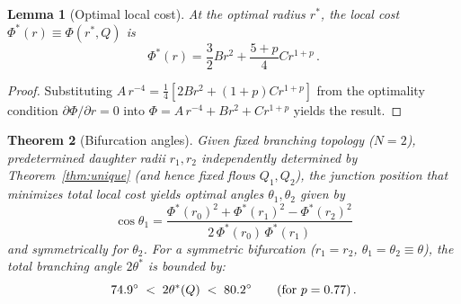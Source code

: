 \documentclass[11pt,a4paper]{article}
\newtheorem{theorem}{Theorem}
\newtheorem{lemma}[theorem]{Lemma}
\theoremstyle{remark}
\begin{document}
\begin{lemma}[Optimal local cost]
\label{lem:cost_opt}
At the optimal radius $r^*$, the local cost $\Phi^*(r) \equiv \Phi(r^*, Q)$ is
\begin{equation}
  \Phi^*(r) = \frac{3}{2}B r^2 + \frac{5+p}{4}C r^{1+p}\,.
  \label{eq:phi_star}
\end{equation}
\end{lemma}
\begin{proof}
Substituting $A\, r^{-4} = \frac{1}{4}[2B r^2 + (1+p)C r^{1+p}]$ from the
optimality condition $\partial\Phi/\partial r = 0$ into $\Phi = A\,r^{-4} + B
r^2 + C r^{1+p}$ yields the result.
\end{proof}

\begin{theorem}[Bifurcation angles]
\label{thm:angles}
Given fixed branching topology ($N=2$), predetermined daughter radii $r_1, r_2$
independently determined by Theorem~\ref{thm:unique} (and hence fixed flows
$Q_1, Q_2$), the junction position that minimizes total local cost yields
optimal angles $\theta_1, \theta_2$ given by
\begin{equation}
  \cos\theta_1 = \frac{\Phi^*(r_0)^2 + \Phi^*(r_1)^2 - \Phi^*(r_2)^2}{2\,\Phi^*(r_0)\,\Phi^*(r_1)}
\end{equation}
and symmetrically for $\theta_2$.
For a symmetric bifurcation ($r_1=r_2$, $\theta_1=\theta_2\equiv\theta$), the
total branching angle $2\theta^*$ is bounded by:
\begin{equation}
  74.9^\circ \;<\; 2\theta^*(Q) \;<\; 80.2^\circ \qquad (\text{for } p=0.77)\,.
\end{equation}
\end{theorem}
\end{document}
